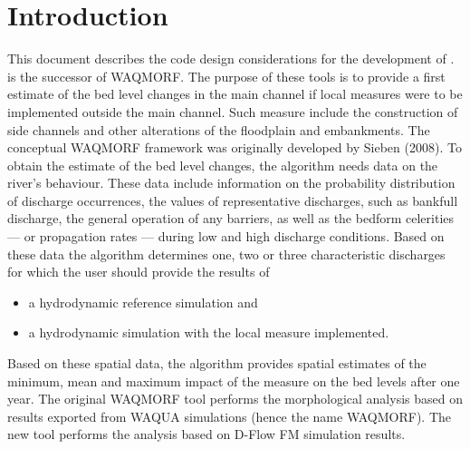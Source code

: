 \chapter{Introduction}

This document describes the code design considerations for the development of \dfastmi.
\dfastmi is the successor of WAQMORF.
The purpose of these tools is to provide a first estimate of the bed level changes in the main channel if local measures were to be implemented outside the main channel.
Such measure include the construction of side channels and other alterations of the floodplain and embankments.
The conceptual WAQMORF framework was originally developed by Sieben (2008).
To obtain the estimate of the bed level changes, the algorithm needs data on the river's behaviour.
These data include information on the probability distribution of discharge occurrences, the values of representative discharges, such as bankfull discharge, the general operation of any barriers, as well as the bedform celerities --- or propagation rates --- during low and high discharge conditions.
Based on these data the algorithm determines one, two or three characteristic discharges for which the user should provide the results of

\begin{itemize}
\item a hydrodynamic reference simulation and
\item a hydrodynamic simulation with the local measure implemented.
\end{itemize}

Based on these spatial data, the algorithm provides spatial estimates of the minimum, mean and maximum impact of the measure on the bed levels after one year.
The original WAQMORF tool performs the morphological analysis based on results exported from WAQUA simulations (hence the name WAQMORF).
The new \dfastmi tool performs the analysis based on D-Flow FM simulation results.